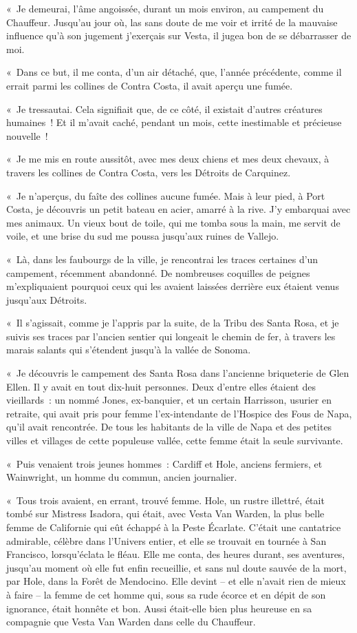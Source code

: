 \documentclass[french,twoside]{book} %
\newcommand\chaptercont{} %
\begin{document}
\chaptercont
\noindent « Je demeurai, l’âme angoissée, durant un mois environ, au campement du Chauffeur. Jusqu’au jour où, las sans doute de me voir et irrité de la mauvaise influence qu’à son jugement j’exerçais sur Vesta, il jugea bon de se débarrasser de moi.\par
« Dans ce but, il me conta, d’un air détaché, que, l’année précédente, comme il errait parmi les collines de Contra Costa, il avait aperçu une fumée.\par
« Je tressautai. Cela signifiait que, de ce côté, il existait d’autres créatures humaines ! Et il m’avait caché, pendant un mois, cette inestimable et précieuse nouvelle !\par
« Je me mis en route aussitôt, avec mes deux chiens et mes deux chevaux, à travers les collines de Contra Costa, vers les Détroits de Carquinez.\par
« Je n’aperçus, du faîte des collines aucune fumée. Mais à leur pied, à Port Costa, je découvris un petit bateau en acier, amarré à la rive. J’y embarquai avec mes animaux. Un vieux bout de toile, qui me tomba sous la main, me servit de voile, et une brise du sud me poussa jusqu’aux ruines de Vallejo.\par
« Là, dans les faubourgs de la ville, je rencontrai les traces certaines d’un campement, récemment abandonné. De nombreuses coquilles de peignes m’expliquaient pourquoi ceux qui les avaient laissées derrière eux étaient venus jusqu’aux Détroits.\par
« Il s’agissait, comme je l’appris par la suite, de la Tribu des Santa Rosa, et je suivis ses traces par l’ancien sentier qui longeait le chemin de fer, à travers les marais salants qui s’étendent jusqu’à la vallée de Sonoma.\par
« Je découvris le campement des Santa Rosa dans l’ancienne briqueterie de Glen Ellen. Il y avait en tout dix-huit personnes. Deux d’entre elles étaient des vieillards : un nommé Jones, ex-banquier, et un certain Harrisson, usurier en retraite, qui avait pris pour femme l’ex-intendante de l’Hospice des Fous de Napa, qu’il avait rencontrée. De tous les habitants de la ville de Napa et des petites villes et villages de cette populeuse vallée, cette femme était la seule survivante.\par
« Puis venaient trois jeunes hommes : Cardiff et Hole, anciens fermiers, et Wainwright, un homme du commun, ancien journalier.\par
« Tous trois avaient, en errant, trouvé femme. Hole, un rustre illettré, était tombé sur Mistress Isadora, qui était, avec Vesta Van Warden, la plus belle femme de Californie qui eût échappé à la Peste Écarlate. C’était une cantatrice admirable, célèbre dans l’Univers entier, et elle se trouvait en tournée à San Francisco, lorsqu’éclata le fléau. Elle me conta, des heures durant, ses aventures, jusqu’au moment où elle fut enfin recueillie, et sans nul doute sauvée de la mort, par Hole, dans la Forêt de Mendocino. Elle devint – et elle n’avait rien de mieux à faire – la femme de cet homme qui, sous sa rude écorce et en dépit de son ignorance, était honnête et bon. Aussi était-elle bien plus heureuse en sa compagnie que Vesta Van Warden dans celle du Chauffeur.\par
\end{document}
